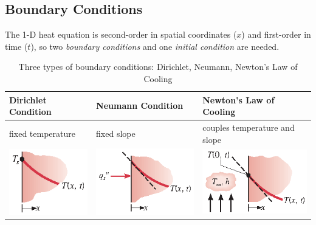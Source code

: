 \documentclass[12pt, a4paper]{article}
\numberwithin{equation}{subsection}
\begin{document}
\subsection{Boundary Conditions}
The 1-D heat equation is second-order in spatial coordinates ($x$) and first-order in time ($t$), so two \textit{boundary conditions} and one \textit{initial condition} are needed.
\begin{table}[H]
    \centering
    \begin{tabularx}{\textwidth}{>{\centering\arraybackslash}X|>{\centering\arraybackslash}X|>{\centering\arraybackslash}X}
    \toprule
        \textbf{Dirichlet Condition} & \textbf{Neumann Condition} & \textbf{Newton's Law of Cooling}  \\
    \midrule
        fixed temperature & fixed slope & couples temperature and slope \\
    \centering
    \includegraphics[]{img/Dirichlet.eps} &
    \centering
    \includegraphics[]{img/Neumann.eps} &
    {\centering
    \includegraphics[]{img/Newtons_law_of_cooling.eps}}\\
    \bottomrule
    \end{tabularx}
    \caption{Three types of boundary conditions: Dirichlet, Neumann, Newton's Law of Cooling}
    \label{tab:my_label}
\end{table}
\end{document}
